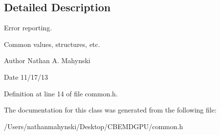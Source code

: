 \subsection{Detailed Description}
Error reporting. 

Common values, structures, etc. \begin{DoxyAuthor}{Author}
Nathan A. Mahynski 
\end{DoxyAuthor}
\begin{DoxyDate}{Date}
11/17/13 
\end{DoxyDate}


Definition at line 14 of file common.\-h.



The documentation for this class was generated from the following file\-:\begin{DoxyCompactItemize}
\item 
/\-Users/nathanmahynski/\-Desktop/\-C\-B\-E\-M\-D\-G\-P\-U/common.\-h\end{DoxyCompactItemize}
